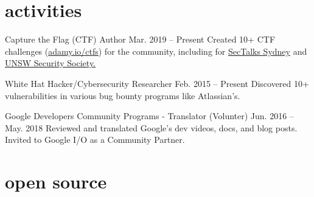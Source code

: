 \documentclass[hidelinks__VERSION__]{adamyi-cv}
\begin{document}

\section{activities}

\begin{entrylist}


\entry
{Capture the Flag (CTF) Author}
{Mar. 2019 -- Present}
{Created 10+ CTF challenges (\href{https://adamy.io/ctfs}{adamy.io/ctfs}) for the community, including for \href{https://www.sectalks.org/sydney/}{SecTalks Sydney} and \href{https://unswsecurity.com/}{UNSW Security Society.}}


\entry
{White Hat Hacker/Cybersecurity Researcher}
{Feb. 2015 -- Present}
{Discovered 10+ vulnerabilities in various bug bounty programs like Atlassian's.}


\entry
{Google Developers Community Programs - Translator (Volunter)}
{Jun. 2016 -- May. 2018}
{Reviewed and translated Google's dev videos, docs, and blog posts. Invited to Google I/O as a Community Partner.}

\end{entrylist}


\section{open source}
\end{document}
